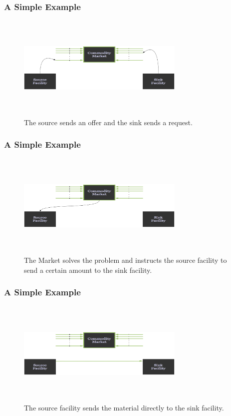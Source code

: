 \begin{frame}[ctb!]
  \frametitle{A Simple Example}
  \begin{figure}[htbp!]
    \begin{center}
      \includegraphics[height=5cm, width=8cm]{./images/offreq.eps}
    \end{center}
    \caption{ The source sends an offer and the sink sends a request.} 
    \label{fig:offreq}
  \end{figure}
\end{frame}
\begin{frame}[ctb!]
  \frametitle{A Simple Example}
  \begin{figure}[htbp!]
    \begin{center}
      \includegraphics[height=5cm, width=8cm]{./images/transmess.eps}
    \end{center}
    \caption{ The Market solves the problem and instructs the source 
    facility to send a certain amount to the sink facility.} 
    \label{fig:transmess}
  \end{figure}
\end{frame}
\begin{frame}[ctb!]
  \frametitle{A Simple Example}
  \begin{figure}[htbp!]
    \begin{center}
      \includegraphics[height=5cm, width=8cm]{./images/trans.eps}
    \end{center}
    \caption{ The source facility sends the material directly to the 
    sink facility.} 
    \label{fig:trans}
  \end{figure}
\end{frame}
